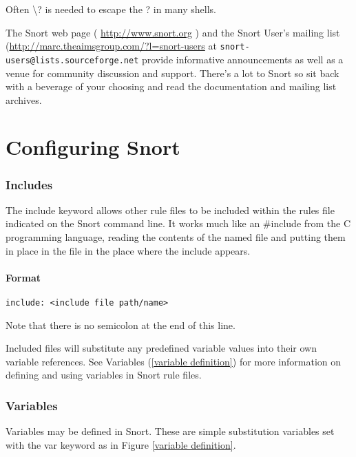 \documentclass[english]{report}
\newenvironment{note}{
    \vspace{10pt}{\textsf{
        {\Huge{$\triangle$\hspace{-12.5pt}{\Large{$^!$}}}}\hspace{5pt}
        {\Large{NOTE}}
    }
    }

    \begin{center}
    \par\vspace{-10pt}
    \begin{lrbox}{\savepar}
    \begin{minipage}[r]{6.2in}
}
{
    \end{minipage}
    \end{lrbox}
    \fbox{
        \usebox{
            \savepar
        }
    }
    \par\vskip10pt
    \end{center}
}
\begin{document}
\begin{note}
Often \textbackslash{}? is needed to escape the ? in many shells. 
\end{note}

The Snort web page ( \url{http://www.snort.org} ) and the Snort User's mailing
list (\url{http://marc.theaimsgroup.com/?l=snort-users} at
\verb?snort-users@lists.sourceforge.net? provide informative announcements as
well as a venue for community discussion and support. There's a lot to Snort so
sit back with a beverage of your choosing and read the documentation and
mailing list archives.

\newpage
\chapter{Configuring Snort \label{Configuring Snort}}

\subsection{Includes}

The include keyword allows other rule files to be included within the rules
file indicated on the Snort command line. It works much like an \#include from
the C programming language, reading the contents of the named file and putting
them in place in the file in the place where the include appears.

\subsubsection{Format}
\begin{verbatim}
include: <include file path/name>
\end{verbatim}

\begin{note}
Note that there is no semicolon at the end of this line. 
\end{note}

Included files will substitute any predefined variable values into their own
variable references.  See Variables (\ref{variable definition}) for more
information on defining and using variables in Snort rule files.

\subsection{Variables \label{variables}}

Variables may be defined in Snort. These are simple substitution variables
set with the var keyword as in Figure \ref{variable definition}.
\end{document}
